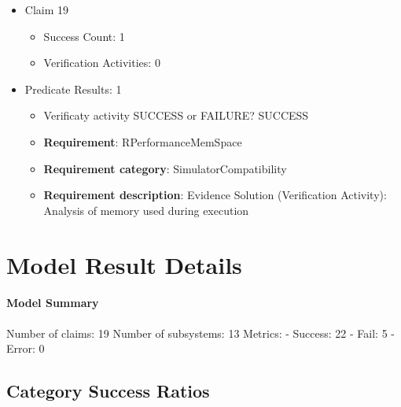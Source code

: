 \documentclass{article}
\begin{document}
\begin{itemize}
  				  \item Claim 19
				\begin{itemize}
			    	\item Success Count: 1 
			    	\item Verification Activities: 0
				\end{itemize}
				
									    
				\item Predicate Results: 1
					\begin{itemize}				
					\item Verificaty activity SUCCESS or FAILURE? SUCCESS
					
					\item \textbf{Requirement}: RPerformanceMemSpace 
					\item \textbf{Requirement category}: SimulatorCompatibility
					\item \textbf{Requirement description}: Evidence Solution (Verification Activity): Analysis of memory used during execution
					\end{itemize}

			\end{itemize}

			\section{Model Result Details} 
			\paragraph{Model Summary}
			Number of claims: 19
			Number of subsystems: 13
			Metrics:
			- Success: 22
			- Fail: 5
			- Error: 0
			
	

					\subsection{Category Success Ratios}
						
\end{document}
